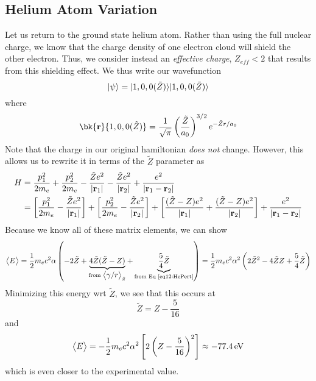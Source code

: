 \subsection{Helium Atom Variation}
Let us return to the ground state helium atom. Rather than using the full nuclear charge, we know that the charge density of one electron cloud will shield the other electron. Thus, we consider instead an \emph{effective charge}, \(Z_{eff}<2\) that results from this shielding effect. We thus write our wavefunction
\[\lvert\psi\rangle = \lvert1,0,0(\tilde Z)\rangle\lvert1,0,0(\tilde Z)\rangle\]
where
\[\bk{\vb r}{1,0,0(\tilde Z)} = \frac{1}{\sqrt{\pi}}\left(\frac{\tilde Z}{a_0}\right)^{3/2}e^{-\tilde Z r/a_0}\]
Note that the charge in our original hamiltonian \emph{does not} change. However, this allows us to rewrite it in terms of the \(\tilde Z\) parameter as
\begin{align*}
	H &= \frac{p_1^2}{2m_e}+\frac{p_2^2}{2m_e} - \frac{\tilde Ze^2}{\left|\mathbf{r}_1\right|}-\frac{\tilde Ze^2}{\left|\mathbf{r}_2\right|} + \frac{e^2}{\left|\mathbf{r}_1-\mathbf{r}_2\right|}\\
	  &=\left[\frac{p_1^2}{2m_e}-\frac{\tilde Z e^2}{\left|\mathbf{r}_1\right|}\right]+\left[\frac{p_2^2}{2m_e}-\frac{\tilde Z e^2}{\left|\mathbf{r}_2\right|}\right] +\left[\frac{(\tilde Z-Z)e^2}{\left|\mathbf{r}_1\right|}+\frac{(\tilde Z-Z)e^2}{\left|\mathbf{r}_2\right|}\right] + \frac{e^2}{\left|\mathbf{r}_1-\mathbf{r}_2\right|}
\end{align*}
Because we know all of these matrix elements, we can show
\[\left\langle \begin{matrix}E\end{matrix} \right\rangle = \frac{1}{2}m_ec^2\alpha\left(-2\tilde Z + \underbrace{4\tilde Z(\tilde Z-Z)}_{\text{from }\left\langle \begin{matrix}\gamma/r\end{matrix} \right\rangle_{\tilde Z}} + \underbrace{\frac{5}{4}\tilde Z}_{\text{from Eq~\ref{eq12:HePert}}}\right) = \frac{1}{2}m_ec^2\alpha^2\left(2\tilde Z^2-4\tilde ZZ+\frac{5}{4}\tilde Z\right)\]
Minimizing this energy wrt \(\tilde Z\), we see that this occurs at
\[\tilde Z = Z-\frac{5}{16}\]
and
\[\left\langle \begin{matrix}E\end{matrix} \right\rangle = -\frac{1}{2}m_e c^2 \alpha^2\left[2\left(Z-\frac{5}{16}\right)^2\right]\approx \SI{-77.4}{eV}\]
which is even closer to the experimental value.

